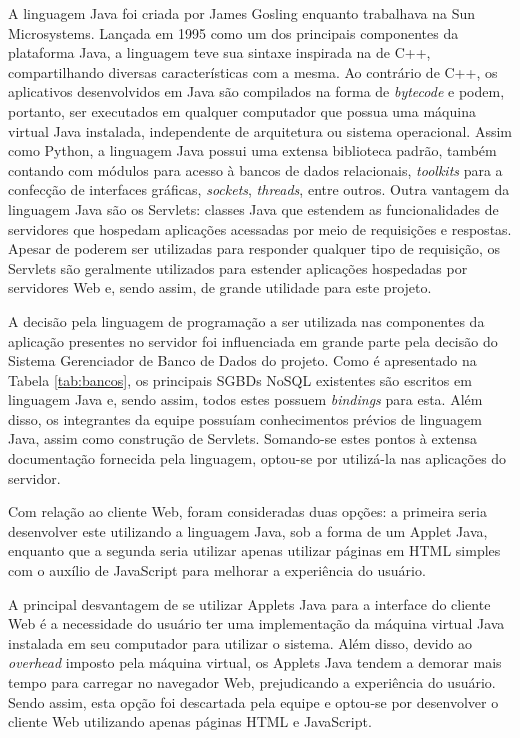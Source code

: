 A linguagem Java foi criada por James Gosling enquanto trabalhava na Sun Microsystems.
Lançada em 1995 como um dos principais componentes da plataforma Java, a linguagem teve sua sintaxe inspirada na de C++, compartilhando diversas características com a mesma.
Ao contrário de C++, os aplicativos desenvolvidos em Java são compilados na forma de \emph{bytecode} e podem, portanto, ser executados em qualquer computador que possua uma máquina virtual Java instalada, independente de arquitetura ou sistema operacional.
Assim como Python, a linguagem Java possui uma extensa biblioteca padrão, também contando com módulos para acesso à bancos de dados relacionais, \emph{toolkits} para a confecção de interfaces gráficas, \emph{sockets}, \emph{threads}, entre outros.
Outra vantagem da linguagem Java são os Servlets: classes Java que estendem as funcionalidades de servidores que hospedam aplicações acessadas por meio de requisições e respostas.
Apesar de poderem ser utilizadas para responder qualquer tipo de requisição, os Servlets são geralmente utilizados para estender aplicações hospedadas por servidores Web e, sendo assim, de grande utilidade para este projeto.

A decisão pela linguagem de programação a ser utilizada nas componentes da aplicação presentes no servidor foi influenciada em grande parte pela decisão do Sistema Gerenciador de Banco de Dados do projeto.
Como é apresentado na Tabela \ref{tab:bancos}, os principais SGBDs NoSQL existentes são escritos em linguagem Java e, sendo assim, todos estes possuem \emph{bindings} para esta.
Além disso, os integrantes da equipe possuíam conhecimentos prévios de linguagem Java, assim como construção de Servlets.
Somando-se estes pontos à extensa documentação fornecida pela linguagem, optou-se por utilizá-la nas aplicações do servidor.

Com relação ao cliente Web, foram consideradas duas opções: a primeira seria desenvolver este utilizando a linguagem Java, sob a forma de um Applet Java, enquanto que a segunda seria utilizar apenas utilizar páginas em HTML simples com o auxílio de JavaScript para melhorar a experiência do usuário.

A principal desvantagem de se utilizar Applets Java para a interface do cliente Web é a necessidade do usuário ter uma implementação da máquina virtual Java instalada em seu computador para utilizar o sistema.
Além disso, devido ao \emph{overhead} imposto pela máquina virtual, os Applets Java tendem a demorar mais tempo para carregar no navegador Web, prejudicando a experiência do usuário.
Sendo assim, esta opção foi descartada pela equipe e optou-se por desenvolver o cliente Web utilizando apenas páginas HTML e JavaScript.

